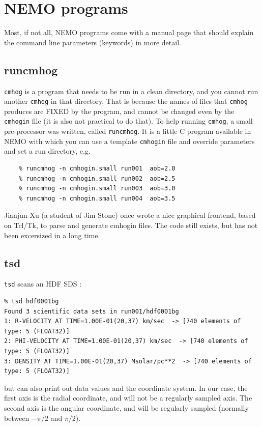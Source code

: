 \documentclass[10pt,dvips]{article}
\begin{document}
\section{NEMO programs}

Most, if not all, NEMO programs come with a manual page that should
explain the command line parameters (keywords) in more detail.

\subsection{runcmhog}

{\tt cmhog} is a program that needs to be run in a clean directory, and you
cannot run another {\tt cmhog} in that directory. That is because the names
of files that {\tt cmhog} produces are FIXED by the program, and cannot be
changed even by the {\tt cmhogin} file (it is also not practical to do that).
To help running {\tt cmhog}, a small pre-processor was written, called
{\tt runcmhog}. It is a little C program available in NEMO with which you
can use a template {\tt cmhogin} file and override parameters and set
a run directory, e.g.

\begin{verbatim}
    % runcmhog -n cmhogin.small run001  aob=2.0
    % runcmhog -n cmhogin.small run002  aob=2.5
    % runcmhog -n cmhogin.small run003  aob=3.0
    % runcmhog -n cmhogin.small run004  aob=3.5
\end{verbatim}

Jianjun Xu (a student of Jim Stone) once wrote a nice graphical frontend,
based on Tcl/Tk, to parse and generate cmhogin files. The code still
exists, but has not been excersized in a long time.

\subsection{tsd}

{\tt tsd} scans an HDF SDS :
\footnotesize\begin{verbatim}
% tsd hdf0001bg 
Found 3 scientific data sets in run001/hdf0001bg
1: R-VELOCITY AT TIME=1.00E-01(20,37) km/sec  -> [740 elements of type: 5 (FLOAT32)]
2: PHI-VELOCITY AT TIME=1.00E-01(20,37) km/sec  -> [740 elements of type: 5 (FLOAT32)]
3: DENSITY AT TIME=1.00E-01(20,37) Msolar/pc**2  -> [740 elements of type: 5 (FLOAT32)]
\end{verbatim}\normalsize

but can also print out data values and the coordinate system. In our case, the
first axis is the radial coordinate, and will not be a regularly sampled axis. The
second axis is the angular coordinate, and will be regularly sampled
(normally between $-\pi/2$ and $\pi/2$).
\end{document}
